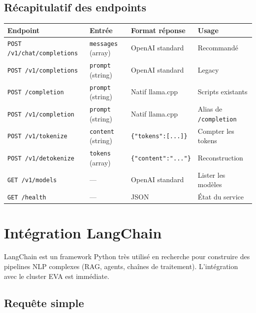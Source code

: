 \documentclass[12pt, a4paper, twoside]{article}
\begin{document}
\subsection{Récapitulatif des endpoints}

\begin{center}
\begin{tabular}{L{4.5cm} L{2.5cm} L{2.5cm} L{3.5cm}}
  \toprule
  \textbf{Endpoint} & \textbf{Entrée} & \textbf{Format réponse} & \textbf{Usage} \\
  \midrule
  \texttt{POST /v1/chat/completions} & \texttt{messages} (array) & OpenAI standard & Recommandé \\
  \texttt{POST /v1/completions}      & \texttt{prompt} (string)  & OpenAI standard & Legacy \\
  \texttt{POST /completion}          & \texttt{prompt} (string)  & Natif llama.cpp & Scripts existants \\
  \texttt{POST /v1/completion}       & \texttt{prompt} (string)  & Natif llama.cpp & Alias de \texttt{/completion} \\
  \texttt{POST /v1/tokenize}         & \texttt{content} (string) & \texttt{\{"tokens":[...]\}} & Compter les tokens \\
  \texttt{POST /v1/detokenize}       & \texttt{tokens} (array)   & \texttt{\{"content":"..."\}} & Reconstruction \\
  \texttt{GET /v1/models}            & ---                       & OpenAI standard & Lister les modèles \\
  \texttt{GET /health}               & ---                       & JSON            & État du service \\
  \bottomrule
\end{tabular}
\end{center}

\section{Intégration LangChain}
\label{sec:langchain}

LangChain est un framework Python très utilisé en recherche pour construire des pipelines
NLP complexes (RAG, agents, chaînes de traitement). L'intégration avec le cluster EVA
est immédiate.

\subsection{Requête simple}
\end{document}
